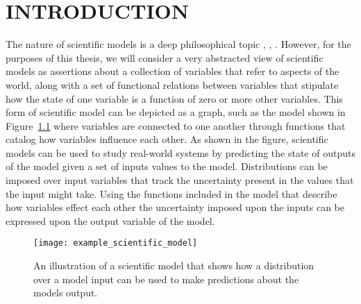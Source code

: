 \chapter{INTRODUCTION\label{chapter:introduction}}
The nature of scientific models is a deep philosophical topic \citep{giere2010explaining}, \citep{morrison2009models}, \citep{frigg2006models}.
However, for the purposes of this thesis, we will consider a very abstracted view of scientific models as assertions about a collection of variables that refer to aspects of the world, along with a set of functional relations between variables that stipulate how the state of one variable is a function of zero or more other variables.
This form of scientific model can be depicted as a graph, such as the model shown in Figure~\ref{fig:example_sci_model} where variables are connected to one another through functions that catalog how variables influence each other.
As shown in the figure, scientific models can be used to study real-world systems by predicting the state of outputs of the model given a set of inputs values to the model.
Distributions can be imposed over input variables that track the uncertainty present in the values that the input might take.
Using the functions included in the model that describe how variables effect each other the uncertainty imposed upon the inputs can be expressed upon the output variable of the model.

\begin{figure}[!htbp]
  \centering
  \texttt{[image: example\_scientific\_model]}
  \caption[Example of a Scientific Model]{An illustration of a scientific model that shows how a distribution over a model input can be used to make predictions about the models output.}
  \label{fig:example_sci_model}
\end{figure}

